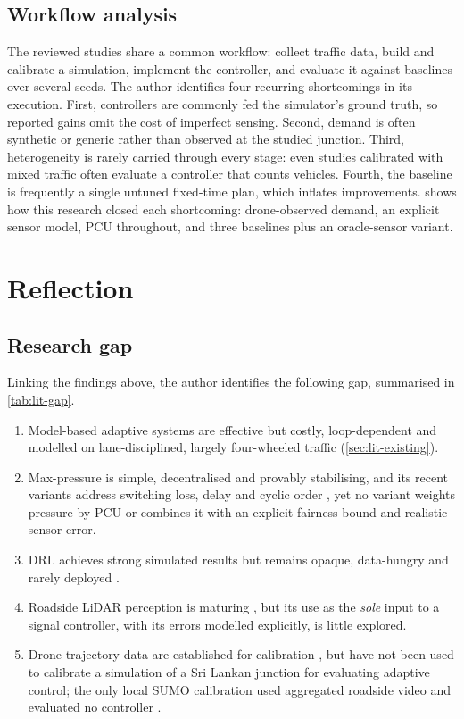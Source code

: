 \subsection{Workflow analysis}\label{sec:lit-workflow}
The reviewed studies share a common workflow: collect traffic data, build and calibrate a simulation,
implement the controller, and evaluate it against baselines over several seeds. The author identifies four
recurring shortcomings in its execution. First, controllers are commonly fed the simulator's ground truth, so
reported gains omit the cost of imperfect sensing. Second, demand is often synthetic or generic rather than
observed at the studied junction. Third, heterogeneity is rarely carried through every stage: even studies
calibrated with mixed traffic often evaluate a controller that counts vehicles. Fourth, the baseline is
frequently a single untuned fixed-time plan, which inflates improvements.  shows how this
research closed each shortcoming: drone-observed demand, an explicit sensor model, PCU throughout, and three
baselines plus an oracle-sensor variant.

\section{Reflection}\label{sec:lit-reflection}
\subsection{Research gap}
Linking the findings above, the author identifies the following gap, summarised in \cref{tab:lit-gap}.
\begin{enumerate}[leftmargin=*,itemsep=2pt]
  \item Model-based adaptive systems are effective but costly, loop-dependent and modelled on lane-disciplined,
        largely four-wheeled traffic (\cref{sec:lit-existing}).
  \item Max-pressure is simple, decentralised and provably stabilising, and its recent variants address
        switching loss, delay and cyclic order \cite{levin2023maxpressure,liu2022novel,wang2022learning}, yet no
        variant weights pressure by PCU or combines it with an explicit fairness bound and realistic sensor
        error.
  \item DRL achieves strong simulated results but remains opaque, data-hungry and rarely deployed
        \cite{wei2021recent,noaeen2022rl}.
  \item Roadside LiDAR perception is maturing \cite{sun2022object,bai2022infrastructure}, but its use as the
        \emph{sole} input to a signal controller, with its errors modelled explicitly, is little explored.
  \item Drone trajectory data are established for calibration \cite{butila2022urban,zheng2024citysim}, but have
        not been used to calibrate a simulation of a Sri Lankan junction for evaluating adaptive control; the
        only local SUMO calibration used aggregated roadside video and evaluated no controller
        \cite{salawavidana2026aggregate}.
\end{enumerate}

